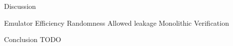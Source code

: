 \begin{frame}{Discussion}
  \begin{outline}
    \1 Emulator Efficiency
    \1 Randomness
    \1 Allowed leakage
    \1 Monolithic Verification
  \end{outline}
\end{frame}

\begin{frame}{Conclusion}
  TODO
\end{frame}
